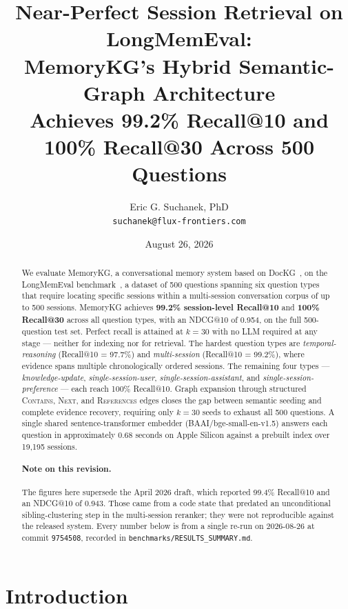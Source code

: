 \documentclass[11pt,a4paper]{article}
\title{\textbf{Near-Perfect Session Retrieval on LongMemEval:}\\
       \large MemoryKG's Hybrid Semantic-Graph Architecture\\
       Achieves 99.2\% Recall@10 and 100\% Recall@30 Across 500 Questions}
\author{Eric G. Suchanek, PhD\\
        \texttt{suchanek@flux-frontiers.com}}
\date{August 26, 2026}
\begin{document}
\maketitle

\begin{abstract}
We evaluate MemoryKG, a conversational memory system based on
DocKG~\citep{dockg2026}, on the LongMemEval
benchmark~\citep{wang2024longmemeval}, a dataset of 500 questions spanning six
question types that require locating specific sessions within a multi-session
conversation corpus of up to 500 sessions.
MemoryKG achieves \textbf{99.2\% session-level Recall@10} and
\textbf{100\% Recall@30} across all question types, with an NDCG@10 of 0.954,
on the full 500-question test set.
Perfect recall is attained at $k{=}30$ with no LLM required at any stage ---
neither for indexing nor for retrieval.
The hardest question types are \textit{temporal-reasoning} (Recall@10 = 97.7\%)
and \textit{multi-session} (Recall@10 = 99.2\%), where evidence spans multiple
chronologically ordered sessions.
The remaining four types --- \textit{knowledge-update},
\textit{single-session-user}, \textit{single-session-assistant},
and \textit{single-session-preference} --- each reach 100\% Recall@10.
Graph expansion through structured \textsc{Contains}, \textsc{Next}, and
\textsc{References} edges closes the gap between semantic seeding and
complete evidence recovery, requiring only $k{=}30$ seeds to exhaust all 500
questions.
A single shared sentence-transformer embedder (BAAI/bge-small-en-v1.5) answers
each question in approximately 0.68 seconds on Apple Silicon against a
prebuilt index over 19,195 sessions.

\paragraph{Note on this revision.}
The figures here supersede the April 2026 draft, which reported 99.4\%
Recall@10 and an NDCG@10 of 0.943. Those came from a code state that predated
an unconditional sibling-clustering step in the multi-session reranker; they
were not reproducible against the released system. Every number below is from a
single re-run on 2026-08-26 at commit \texttt{9754508}, recorded in
\texttt{benchmarks/RESULTS\_SUMMARY.md}.
\end{abstract}

\section{Introduction}
\label{sec:intro}
\end{document}
